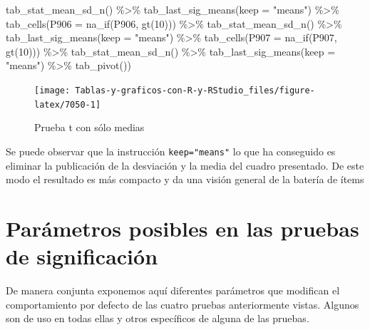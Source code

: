 \documentclass[
]{book}
\newenvironment{Shaded}{\begin{snugshade}}{\end{snugshade}}
\newcommand{\AttributeTok}[1]{\textcolor[rgb]{0.77,0.63,0.00}{#1}}
\newcommand{\DecValTok}[1]{\textcolor[rgb]{0.00,0.00,0.81}{#1}}
\newcommand{\FunctionTok}[1]{\textcolor[rgb]{0.00,0.00,0.00}{#1}}
\newcommand{\NormalTok}[1]{#1}
\newcommand{\SpecialCharTok}[1]{\textcolor[rgb]{0.00,0.00,0.00}{#1}}
\newcommand{\StringTok}[1]{\textcolor[rgb]{0.31,0.60,0.02}{#1}}
\begin{document}
\begin{Shaded}
\begin{Highlighting}[]
  \FunctionTok{tab\_stat\_mean\_sd\_n}\NormalTok{() }\SpecialCharTok{\%\textgreater{}\%}
  \FunctionTok{tab\_last\_sig\_means}\NormalTok{(}\AttributeTok{keep =} \StringTok{"means"}\NormalTok{) }\SpecialCharTok{\%\textgreater{}\%}
  \FunctionTok{tab\_cells}\NormalTok{(}\AttributeTok{P906 =} \FunctionTok{na\_if}\NormalTok{(P906, }\FunctionTok{gt}\NormalTok{(}\DecValTok{10}\NormalTok{))) }\SpecialCharTok{\%\textgreater{}\%}
  \FunctionTok{tab\_stat\_mean\_sd\_n}\NormalTok{() }\SpecialCharTok{\%\textgreater{}\%}
  \FunctionTok{tab\_last\_sig\_means}\NormalTok{(}\AttributeTok{keep =} \StringTok{"means"}\NormalTok{) }\SpecialCharTok{\%\textgreater{}\%}
  \FunctionTok{tab\_cells}\NormalTok{(}\AttributeTok{P907 =} \FunctionTok{na\_if}\NormalTok{(P907, }\FunctionTok{gt}\NormalTok{(}\DecValTok{10}\NormalTok{))) }\SpecialCharTok{\%\textgreater{}\%}
  \FunctionTok{tab\_stat\_mean\_sd\_n}\NormalTok{() }\SpecialCharTok{\%\textgreater{}\%}
  \FunctionTok{tab\_last\_sig\_means}\NormalTok{(}\AttributeTok{keep =} \StringTok{"means"}\NormalTok{) }\SpecialCharTok{\%\textgreater{}\%}
  \FunctionTok{tab\_pivot}\NormalTok{())}
\end{Highlighting}
\end{Shaded}

\begin{figure}[H]

{\centering \texttt{[image: Tablas-y-graficos-con-R-y-RStudio\_files/figure-latex/7050-1]} 

}

\caption{Prueba t con sólo medias}\label{fig:7050}
\end{figure}

Se puede observar que la instrucción \texttt{keep="means"} lo que ha conseguido es eliminar la publicación de la desviación y la media del cuadro presentado. De este modo el resultado es más compacto y da una visión general de la batería de ítems

\hypertarget{paruxe1metros-posibles-en-las-pruebas-de-significaciuxf3n}{%
\section{Parámetros posibles en las pruebas de significación}\label{paruxe1metros-posibles-en-las-pruebas-de-significaciuxf3n}}

De manera conjunta exponemos aquí diferentes parámetros que modifican el comportamiento por defecto de las cuatro pruebas anteriormente vistas. Algunos son de uso en todas ellas y otros específicos de alguna de las pruebas.
\end{document}
